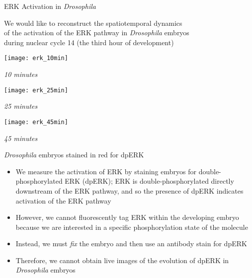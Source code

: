 \begin{frame}{ERK Activation in {\em Drosophila}}
	
	\centering
	We would like to reconstruct the spatiotemporal dynamics \\
	of the activation of the ERK pathway in {\em Drosophila} embryos\\
	during nuclear cycle 14 (the third hour of development)

    \centering
	\begin{minipage}{0.3\textwidth}
	    \texttt{[image: erk\_10min]}\\
	    {\scriptsize \em 10 minutes \par}
	\end{minipage}
	\begin{minipage}{0.3\textwidth}
	    \texttt{[image: erk\_25min]}\\
	    {\scriptsize \em 25 minutes \par}
	\end{minipage}
	\begin{minipage}{0.3\textwidth}
	    \texttt{[image: erk\_45min]}\\
	    {\scriptsize \em 45 minutes \par}
	\end{minipage}
	
	{\small {\em Drosophila} embryos stained in red for dpERK}
	
	\begin{itemize}
		\item We measure the activation of ERK by staining embryos for double-phosphorylated ERK (dpERK); ERK is double-phosphorylated  directly downstream of the ERK pathway, and so the presence of dpERK indicates activation of the ERK pathway
	
		\item However, we cannot fluorescently tag ERK within the developing embryo because we are interested in a specific phosphorylation state of the molecule
		
		\item Instead, we must {\em fix} the embryo and then use an antibody stain for dpERK
	
		\item Therefore, we cannot obtain live images of the evolution of dpERK in {\em Drosophila} embryos
	\end{itemize}
	
\end{frame}

